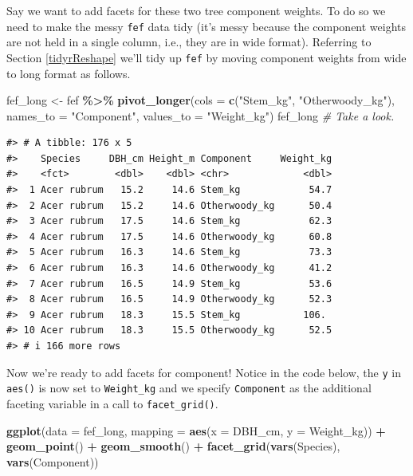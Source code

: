 \documentclass[
  11pt,
]{krantz}
\newenvironment{Shaded}{\begin{snugshade}}{\end{snugshade}}
\newcommand{\CommentTok}[1]{\textcolor[rgb]{0.56,0.35,0.01}{\textit{#1}}}
\newcommand{\DataTypeTok}[1]{\textcolor[rgb]{0.13,0.29,0.53}{#1}}
\newcommand{\KeywordTok}[1]{\textcolor[rgb]{0.13,0.29,0.53}{\textbf{#1}}}
\newcommand{\NormalTok}[1]{#1}
\newcommand{\OperatorTok}[1]{\textcolor[rgb]{0.81,0.36,0.00}{\textbf{#1}}}
\newcommand{\StringTok}[1]{\textcolor[rgb]{0.31,0.60,0.02}{#1}}
\theoremstyle{definition}
\theoremstyle{definition}
\theoremstyle{definition}
\theoremstyle{definition}
\theoremstyle{remark}
\begin{document}
Say we want to add facets for these two tree component weights. To do so we need to make the messy \texttt{fef} data tidy (it's messy because the component weights are not held in a single column, i.e., they are in wide format). Referring to Section \ref{tidyrReshape} we'll tidy up \texttt{fef} by moving component weights from wide to long format as follows.

\begin{Shaded}
\begin{Highlighting}[]
\NormalTok{fef\_long \textless{}{-}}\StringTok{ }\NormalTok{fef }\OperatorTok{\%\textgreater{}\%}\StringTok{ }
\StringTok{  }\KeywordTok{pivot\_longer}\NormalTok{(}\DataTypeTok{cols =} \KeywordTok{c}\NormalTok{(}\StringTok{"Stem\_kg"}\NormalTok{, }\StringTok{"Otherwoody\_kg"}\NormalTok{),}
               \DataTypeTok{names\_to =} \StringTok{"Component"}\NormalTok{,}
               \DataTypeTok{values\_to =} \StringTok{"Weight\_kg"}\NormalTok{)}
\NormalTok{fef\_long }\CommentTok{\# Take a look.}
\end{Highlighting}
\end{Shaded}

\begin{verbatim}
#> # A tibble: 176 x 5
#>    Species     DBH_cm Height_m Component     Weight_kg
#>    <fct>        <dbl>    <dbl> <chr>             <dbl>
#>  1 Acer rubrum   15.2     14.6 Stem_kg            54.7
#>  2 Acer rubrum   15.2     14.6 Otherwoody_kg      50.4
#>  3 Acer rubrum   17.5     14.6 Stem_kg            62.3
#>  4 Acer rubrum   17.5     14.6 Otherwoody_kg      60.8
#>  5 Acer rubrum   16.3     14.6 Stem_kg            73.3
#>  6 Acer rubrum   16.3     14.6 Otherwoody_kg      41.2
#>  7 Acer rubrum   16.5     14.9 Stem_kg            53.6
#>  8 Acer rubrum   16.5     14.9 Otherwoody_kg      52.3
#>  9 Acer rubrum   18.3     15.5 Stem_kg           106. 
#> 10 Acer rubrum   18.3     15.5 Otherwoody_kg      52.5
#> # i 166 more rows
\end{verbatim}

Now we're ready to add facets for component! Notice in the code below, the \texttt{y} in \texttt{aes()} is now set to \texttt{Weight\_kg} and we specify \texttt{Component} as the additional faceting variable in a call to \texttt{facet\_grid()}.

\begin{Shaded}
\begin{Highlighting}[]
\KeywordTok{ggplot}\NormalTok{(}\DataTypeTok{data =}\NormalTok{ fef\_long, }\DataTypeTok{mapping =} \KeywordTok{aes}\NormalTok{(}\DataTypeTok{x =}\NormalTok{ DBH\_cm, }\DataTypeTok{y =}\NormalTok{ Weight\_kg)) }\OperatorTok{+}
\StringTok{  }\KeywordTok{geom\_point}\NormalTok{() }\OperatorTok{+}
\StringTok{  }\KeywordTok{geom\_smooth}\NormalTok{() }\OperatorTok{+}
\StringTok{  }\KeywordTok{facet\_grid}\NormalTok{(}\KeywordTok{vars}\NormalTok{(Species), }\KeywordTok{vars}\NormalTok{(Component))}
\end{Highlighting}
\end{Shaded}
\end{document}
